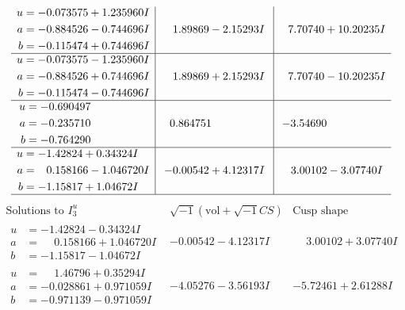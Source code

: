 \documentclass[1p]{elsarticle_modified}
\theoremstyle{definition}
\newcommand{\I}{\sqrt{-1}}
\begin{document}
$$\begin{array}{c|c|c}
\begin{aligned}
u &= -0.073575 + 1.235960 I \\
a &= -0.884526 - 0.744696 I \\
b &= -0.115474 + 0.744696 I\end{aligned}
 & \phantom{-}1.89869 - 2.15293 I & \phantom{-}7.70740 + 10.20235 I \\ \hline\begin{aligned}
u &= -0.073575 - 1.235960 I \\
a &= -0.884526 + 0.744696 I \\
b &= -0.115474 - 0.744696 I\end{aligned}
 & \phantom{-}1.89869 + 2.15293 I & \phantom{-}7.70740 - 10.20235 I \\ \hline\begin{aligned}
u &= -0.690497\phantom{ +0.000000I} \\
a &= -0.235710\phantom{ +0.000000I} \\
b &= -0.764290\phantom{ +0.000000I}\end{aligned}
 & \phantom{-}0.864751\phantom{ +0.000000I} & -3.54690\phantom{ +0.000000I} \\ \hline\begin{aligned}
u &= -1.42824 + 0.34324 I \\
a &= \phantom{-}0.158166 - 1.046720 I \\
b &= -1.15817 + 1.04672 I\end{aligned}
 & -0.00542 + 4.12317 I & \phantom{-}3.00102 - 3.07740 I\\
 \hline 
 \end{array}$$\newpage$$\begin{array}{c|c|c}  
\text{Solutions to }I^u_{3}& \I (\text{vol} + \sqrt{-1}CS) & \text{Cusp shape}\\
 \hline 
\begin{aligned}
u &= -1.42824 - 0.34324 I \\
a &= \phantom{-}0.158166 + 1.046720 I \\
b &= -1.15817 - 1.04672 I\end{aligned}
 & -0.00542 - 4.12317 I & \phantom{-}3.00102 + 3.07740 I \\ \hline\begin{aligned}
u &= \phantom{-}1.46796 + 0.35294 I \\
a &= -0.028861 + 0.971059 I \\
b &= -0.971139 - 0.971059 I\end{aligned}
 & -4.05276 - 3.56193 I & -5.72461 + 2.61288 I \\ \hline\begin{aligned}

\end{aligned}
\end{array}$$
\end{document}
